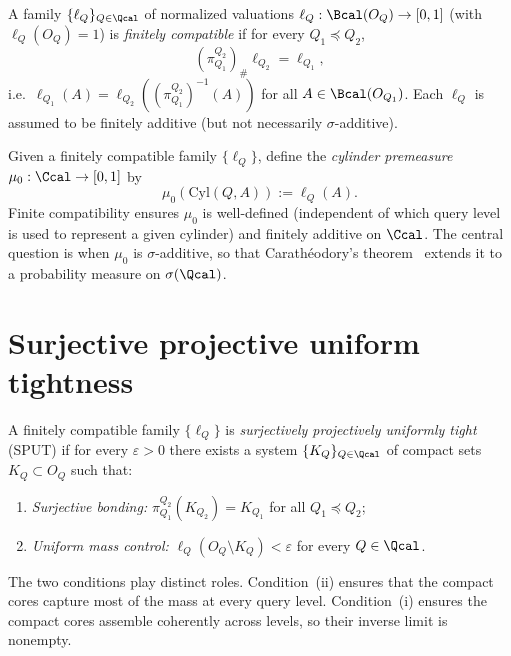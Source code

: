 \begin{definition}
A family $\{\ell_Q\}_{Q \in \Qcal}$ of normalized valuations
$\ell_Q : \Bcal(O_Q) \to [0,1]$ (with $\ell_Q(O_Q) = 1$) is
\emph{finitely compatible} if for every $Q_1 \preceq Q_2$,
\[
(\pi^{Q_2}_{Q_1})_\# \ell_{Q_2} = \ell_{Q_1},
\]
i.e.\ $\ell_{Q_1}(A) = \ell_{Q_2}((\pi^{Q_2}_{Q_1})^{-1}(A))$ for
all $A \in \Bcal(O_{Q_1})$.  Each $\ell_Q$ is assumed to be
finitely additive (but not necessarily $\sigma$-additive).
\end{definition}

\begin{remark}
Given a finitely compatible family $\{\ell_Q\}$, define the
\emph{cylinder premeasure} $\mu_0 : \Ccal \to [0,1]$ by
\[
\mu_0(\mathrm{Cyl}(Q, A)) := \ell_Q(A).
\]
Finite compatibility ensures $\mu_0$ is well-defined (independent of
which query level is used to represent a given cylinder) and
finitely additive on $\Ccal$.  The central question is when $\mu_0$
is $\sigma$-additive, so that Carath\'eodory's theorem~\cite{Billingsley1995,Bogachev2007} extends it
to a probability measure on $\sigma(\Qcal)$.
\end{remark}

\section{Surjective projective uniform tightness}\label{sec:sput}

\begin{definition}
\label{def:sput}
A finitely compatible family $\{\ell_Q\}$ is \emph{surjectively
projectively uniformly tight} (SPUT) if for every $\varepsilon > 0$
there exists a system $\{K_Q\}_{Q \in \Qcal}$ of compact sets
$K_Q \subset O_Q$ such that:
\begin{enumerate}[label=(\roman*)]
\item \emph{Surjective bonding:}
  $\pi^{Q_2}_{Q_1}(K_{Q_2}) = K_{Q_1}$ for all $Q_1 \preceq Q_2$;
\item \emph{Uniform mass control:}
  $\ell_Q(O_Q \setminus K_Q) < \varepsilon$ for every $Q \in \Qcal$.
\end{enumerate}
\end{definition}

The two conditions play distinct roles.  Condition~(ii) ensures that
the compact cores capture most of the mass at every query level.
Condition~(i) ensures the compact cores assemble coherently across
levels, so their inverse limit is nonempty.

